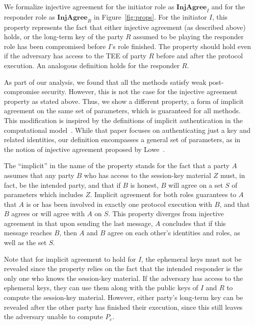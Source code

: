 \documentclass[runningheads]{llncs}
\newcommand{\mFunStyle}[1]{\textsf{#1}}
\newcommand{\mProtocolStyle}[1]{\text{#1}}
\newcommand{\mIStart}{\ensuremath{\mathbf{I}_\mFunStyle{S}}}
\newcommand{\mRStart}{\ensuremath{\mathbf{R}_\mFunStyle{S}}}
\newcommand{\mPredInjI}{\ensuremath{\mathbf{InjAgree}_I}}
\newcommand{\mPredInjR}{\ensuremath{\mathbf{InjAgree}_R}}
\newcommand{\mEdhoc}{\mProtocolStyle{EDHOC}}
\newcommand{\mGxy}{\ensuremath{P_e}}
\newcommand{\mSessKey}{\ensuremath{Z}}
\newcommand{\mTID}{\ensuremath{\mathit{tid}}}
\begin{document}
%
We formalize injective agreement for the initiator role as \mPredInjI{} and
for the responder role as \mPredInjR{} in Figure~\ref{fig:props}.
%
For the initiator $I$, this property represents the fact that either
injective agreement (as described above) holds, or the long-term key of
the party $R$ assumed to be playing the responder role has been
compromised before $I$'s role finished.
%
The property should hold even if the adversary has access to the TEE of party 
$R$
before and after the protocol execution.
An analogous definition holds for the responder $R$.
%

As part of our analysis, we found that all the \mEdhoc{} methods satisfy weak
post-compromise security.
%
However, this is not the case for the injective agreement property as stated 
above.
%
Thus, we show a different property, a form of implicit agreement on the same
set of parameters, which is guaranteed for all methods.
%
This modification is inspired by the definitions of implicit authentication in
the computational model~\cite{DBLP:conf/csfw/GuilhemFW20}.
%
While that paper focuses on authenticating just a key and related identities,
our definition encompasses a general set of parameters, as in the notion of
injective agreement proposed by Lowe~\cite{DBLP:conf/csfw/Lowe97a}.

The ``implicit'' in the name of the property stands for the fact that a party
$A$ assumes that any party $B$ who has access to the session-key material
\mSessKey{} must, in fact, be the intended party, and that if $B$ is honest,
$B$ will agree on a set $S$ of parameters which includes \mSessKey.
%
Implicit agreement for both roles guarantees to $A$ that $A$ is or has been
involved in exactly one protocol execution with $B$, and that $B$ agrees or
will agree with $A$ on $S$.
%
This property diverges from injective agreement in that upon sending
the last message, $A$ concludes that if this message reaches $B$, then $A$
and $B$ agree on each other's identities and roles, as well as the set $S$.
%

Note that for implicit agreement to hold for $I$, the ephemeral keys must not
be revealed since the property relies on the fact that the intended responder
is the only one who knows the session-key material.
%
If the adversary has access to the ephemeral keys, they can use them along 
with
the public keys of $I$ and $R$ to compute the session-key material.
%
However, either party's long-term key can be revealed after the other
party has finished their execution, since this still leaves the adversary
unable to compute \mGxy{}.
%
\end{document}
